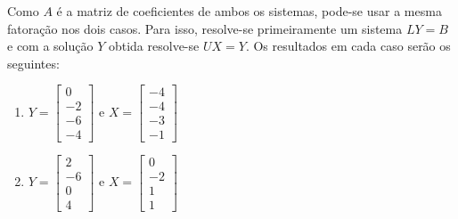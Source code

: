 \documentclass[12pt,a4paper]{article}
\begin{document}
\begin{ExerciseList}
Como $A$ é a matriz de coeficientes de ambos os sistemas, pode-se usar a mesma fatoração nos dois casos. Para isso, resolve-se primeiramente um sistema $LY=B$ e com a solução $Y$ obtida resolve-se $UX = Y$. Os resultados em cada caso serão os seguintes:
\begin{multicols}{2}
\begin{enumerate}
\item
$
 Y  =
\begin{bmatrix}
0 \\ -2 \\ -6 \\ -4
\end{bmatrix}
\text{ e }
X =\begin{bmatrix}
-4 \\ -4 \\ -3 \\ -1
\end{bmatrix}
$
\item
$
 Y  =
\begin{bmatrix}
2 \\ -6 \\ 0 \\ 4
\end{bmatrix}
\text{ e }
 X  =
\begin{bmatrix}
0 \\ -2 \\ 1 \\ 1
\end{bmatrix}
$
\end{enumerate}
\end{multicols}


\end{ExerciseList}
\end{document}
